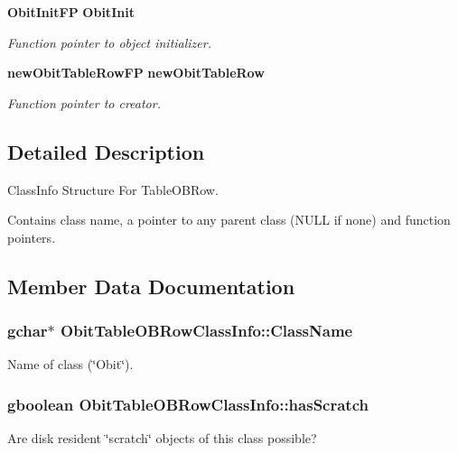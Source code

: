 \begin{CompactItemize}
{\bf Obit\-Init\-FP} {\bf Obit\-Init}
\begin{CompactList}\small\item\em Function pointer to object initializer. \item\end{CompactList}\item 
{\bf new\-Obit\-Table\-Row\-FP} {\bf new\-Obit\-Table\-Row}
\begin{CompactList}\small\item\em Function pointer to creator. \item\end{CompactList}\end{CompactItemize}


\subsection{Detailed Description}
Class\-Info Structure For Table\-OBRow. 

Contains class name, a pointer to any parent class (NULL if none) and function pointers. 



\subsection{Member Data Documentation}
\subsubsection{\setlength{\rightskip}{0pt plus 5cm}gchar$\ast$ {\bf Obit\-Table\-OBRow\-Class\-Info::Class\-Name}}\label{structObitTableOBRowClassInfo_o2}


Name of class (\char`\"{}Obit\char`\"{}). 

\subsubsection{\setlength{\rightskip}{0pt plus 5cm}gboolean {\bf Obit\-Table\-OBRow\-Class\-Info::has\-Scratch}}\label{structObitTableOBRowClassInfo_o1}


Are disk resident \char`\"{}scratch\char`\"{} objects of this class possible? 


